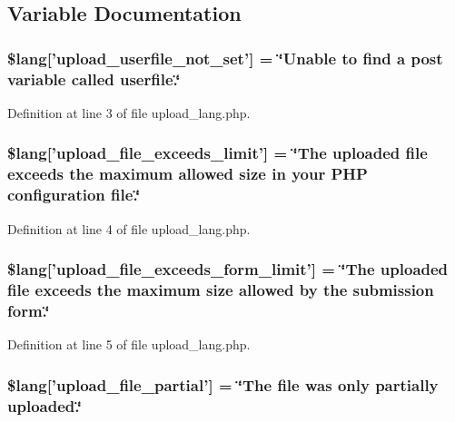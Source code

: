 \subsection{Variable Documentation}
\hypertarget{upload__lang_8php_a6d12ff4074b1e4c6f22a4a5107fae5ee}{
\subsubsection[{\$lang}]{\setlength{\rightskip}{0pt plus 5cm}\$lang\mbox{[}'upload\-\_\-userfile\-\_\-not\-\_\-set'\mbox{]} = \char`\"{}Unable {\bf to} find {\bf a} post variable called userfile.\char`\"{}}}\label{upload__lang_8php_a6d12ff4074b1e4c6f22a4a5107fae5ee}


Definition at line 3 of file upload\-\_\-lang.\-php.

\hypertarget{upload__lang_8php_a9028f049ebbe292a27e0e2b2e5f7d660}{
\subsubsection[{\$lang}]{\setlength{\rightskip}{0pt plus 5cm}\$lang\mbox{[}'upload\-\_\-file\-\_\-exceeds\-\_\-limit'\mbox{]} = \char`\"{}The uploaded file exceeds the maximum allowed size in your P\-H\-P configuration file.\char`\"{}}}\label{upload__lang_8php_a9028f049ebbe292a27e0e2b2e5f7d660}


Definition at line 4 of file upload\-\_\-lang.\-php.

\hypertarget{upload__lang_8php_af6f65d563af150d50dfc6957079fd529}{
\subsubsection[{\$lang}]{\setlength{\rightskip}{0pt plus 5cm}\$lang\mbox{[}'upload\-\_\-file\-\_\-exceeds\-\_\-form\-\_\-limit'\mbox{]} = \char`\"{}The uploaded file exceeds the maximum size allowed by the submission form.\char`\"{}}}\label{upload__lang_8php_af6f65d563af150d50dfc6957079fd529}


Definition at line 5 of file upload\-\_\-lang.\-php.

\hypertarget{upload__lang_8php_a79751b02ce35007a90bd9052f83deed9}{
\subsubsection[{\$lang}]{\setlength{\rightskip}{0pt plus 5cm}\$lang\mbox{[}'upload\-\_\-file\-\_\-partial'\mbox{]} = \char`\"{}The file was only partially uploaded.\char`\"{}}}\label{upload__lang_8php_a79751b02ce35007a90bd9052f83deed9}


